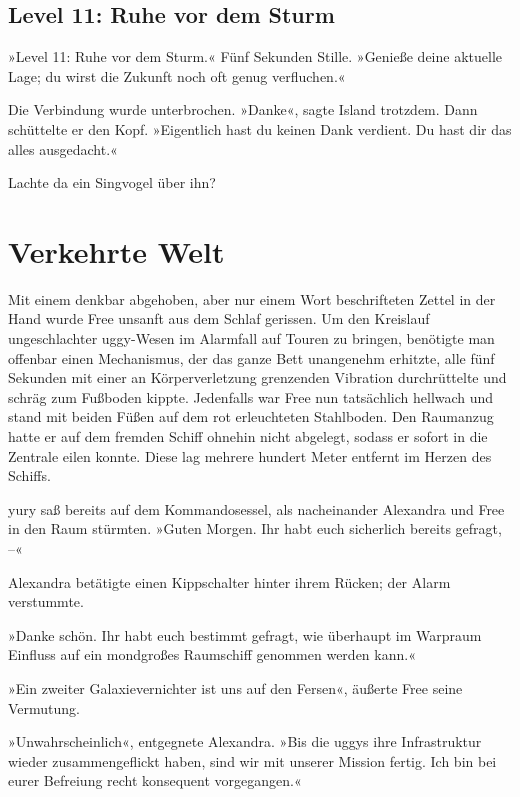 \section{Level 11: Ruhe vor dem Sturm}

»Level 11: Ruhe vor dem Sturm.« Fünf Sekunden Stille. »Genieße deine aktuelle Lage; du wirst die Zukunft noch oft genug verfluchen.«

Die Verbindung wurde unterbrochen. »Danke«, sagte Island trotzdem. Dann schüttelte er den Kopf. »Eigentlich hast du keinen Dank verdient. Du hast dir das alles ausgedacht.«

Lachte da ein Singvogel über ihn?


\chapter{Verkehrte Welt}

Mit einem denkbar abgehoben, aber nur einem Wort beschrifteten Zettel in der Hand wurde Free unsanft aus dem Schlaf gerissen. Um den Kreislauf ungeschlachter uggy-Wesen im Alarmfall auf Touren zu bringen, benötigte man offenbar einen Mechanismus, der das ganze Bett unangenehm erhitzte, alle fünf Sekunden mit einer an Körperverletzung grenzenden Vibration durchrüttelte und schräg zum Fußboden kippte. Jedenfalls war Free nun tatsächlich hellwach und stand mit beiden Füßen auf dem rot erleuchteten Stahlboden. Den Raumanzug hatte er auf dem fremden Schiff ohnehin nicht abgelegt, sodass er sofort in die Zentrale eilen konnte. Diese lag mehrere hundert Meter entfernt im Herzen des Schiffs.


yury saß bereits auf dem Kommandosessel, als nacheinander Alexandra und Free in den Raum stürmten. »Guten Morgen. Ihr habt euch sicherlich bereits gefragt, –«

 Alexandra betätigte einen Kippschalter hinter ihrem Rücken; der Alarm verstummte.

»Danke schön. Ihr habt euch bestimmt gefragt, wie überhaupt im Warpraum Einfluss auf ein mondgroßes Raumschiff genommen werden kann.«

»Ein zweiter Galaxievernichter ist uns auf den Fersen«, äußerte Free seine Vermutung.

»Unwahrscheinlich«, entgegnete Alexandra. »Bis die uggys ihre Infrastruktur wieder zusammengeflickt haben, sind wir mit unserer Mission fertig. Ich bin bei eurer Befreiung recht konsequent vorgegangen.«

